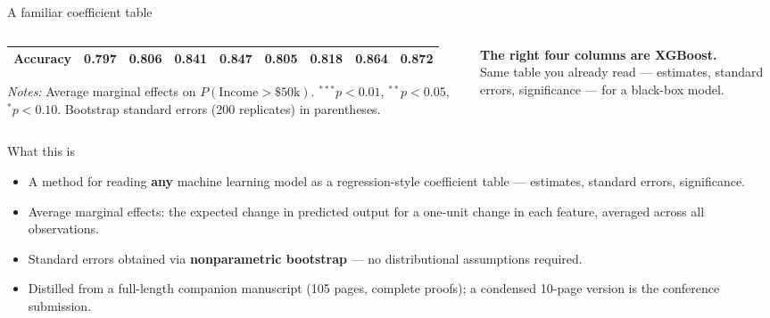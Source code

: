 \documentclass[aspectratio=169]{beamer}
\begin{document}
\begin{frame}{A familiar coefficient table}
\begin{columns}[c]
\begin{column}{0.8\textwidth}
\begin{adjustbox}{max width=\textwidth, max totalheight=0.93\textheight}
\begin{threeparttable}
\begin{tabular}{lrrrrrrrr}
							Accuracy & 0.797 & 0.806 & 0.841 & 0.847 & 0.805 & 0.818 & 0.864 & 0.872 \\
							\bottomrule
						\end{tabular}
						\begin{tablenotes}
							\footnotesize
							\item \textit{Notes:} Average marginal effects on $P(\text{Income} > \$50\text{k})$. $^{***}p<0.01$, $^{**}p<0.05$, $^{*}p<0.10$. Bootstrap standard errors (200 replicates) in parentheses.
						\end{tablenotes}
					\end{threeparttable}
				\end{adjustbox}
			\end{column}
			
			\begin{column}{0.2\textwidth}
				\raggedright
				{\color{accurate}\bfseries The right four columns are XGBoost.}\\[0.6em]
				{\color{ink}\small Same table you already read --- estimates, standard errors, significance --- for a black-box model.}
			\end{column}
		\end{columns}
	\end{frame}
	
	\begin{frame}{What this is}
		\begin{itemize}
			\item A method for reading \textbf{any} machine learning model as a regression-style coefficient table --- estimates, standard errors, significance.
			\item Average marginal effects: the expected change in predicted output for a one-unit change in each feature, averaged across all observations.
			\item Standard errors obtained via \textbf{nonparametric bootstrap} --- no distributional assumptions required.
			\item Distilled from a full-length companion manuscript (105 pages, complete proofs); a condensed 10-page version is the conference submission.
		\end{itemize}
	\end{frame}
	
\end{document}
